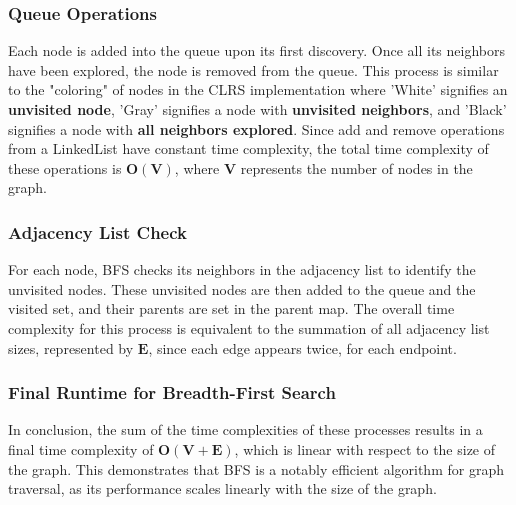 \subsubsection*{Queue Operations}
Each node is added into the queue upon its first discovery. Once all its neighbors have been explored, the node is removed from the queue. This process is similar to the "coloring" of nodes in the CLRS implementation where 'White' signifies an \textbf{unvisited node}, 'Gray' signifies a node with \textbf{unvisited neighbors}, and 'Black' signifies a node with \textbf{all neighbors explored}. Since add and remove operations from a LinkedList have constant time complexity, the total time complexity of these operations is $\mathbf{O(V)}$, where $\mathbf{V}$ represents the number of nodes in the graph.\cite{cormen2001introduction}

\subsubsection*{Adjacency List Check}
For each node, BFS checks its neighbors in the adjacency list to identify the unvisited nodes. These unvisited nodes are then added to the queue and the visited set, and their parents are set in the parent map. The overall time complexity for this process is equivalent to the summation of all adjacency list sizes, represented by $\mathbf{E}$, since each edge appears twice, for each endpoint.\cite{sedgewick2011algorithms}

\subsubsection*{Final Runtime for Breadth-First Search}
In conclusion, the sum of the time complexities of these processes results in a final time complexity of $\mathbf{O(V+E)}$, which is linear with respect to the size of the graph. This demonstrates that BFS is a notably efficient algorithm for graph traversal, as its performance scales linearly with the size of the graph.\cite{cormen2001introduction}